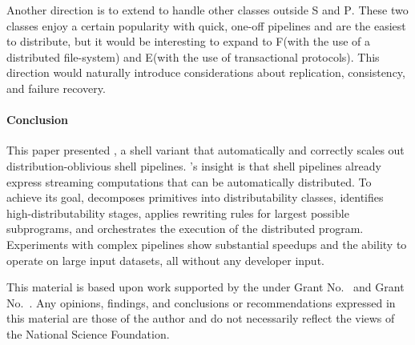 \documentclass[sigplan,10pt,review,anonymous]{acmart}
\newcommand{\cn}[1]{\mbox{\textcircled{\footnotesize #1}}}
\newcommand{\pur}{\cn{\textsc{P}}\xspace}
\newcommand{\sta}{\cn{\textsc{S}}\xspace}
\newcommand{\dfs}{\cn{\textsc{F}}\xspace}
\newcommand{\sid}{\cn{\textsc{E}}\xspace}
\newcommand{\kk}[1]{[{\color{magenta}#1 --- kk}]}
\begin{document}
Another direction is to extend \sys to handle other classes outside \sta and \pur.
These two classes enjoy a certain popularity with quick, one-off pipelines and are the easiest to distribute, but 
it would be interesting to expand to \dfs (with the use of a distributed file-system) and \sid (with the use of transactional protocols).
This direction would naturally introduce considerations about replication, consistency, and failure recovery.


\paragraph{Conclusion}
This paper presented \sys, a shell variant that automatically and correctly scales out distribution-oblivious shell pipelines. 
\sys's insight is that shell pipelines already express streaming computations that can be automatically distributed.
To achieve its goal, \sys
  decomposes primitives into distributability classes,
  identifies high-distributability stages,
  applies rewriting rules for largest possible subprograms,
  and orchestrates the execution of the distributed program.
Experiments with complex pipelines show substantial speedups and the ability to operate on large input datasets, all without any developer input.

\begin{acks}
  This material is based upon work supported by the
   under Grant
  No.~ and Grant
  No.~.  Any opinions, findings, and
  conclusions or recommendations expressed in this material are those
  of the author and do not necessarily reflect the views of the
  National Science Foundation.
\end{acks}
\end{document}

